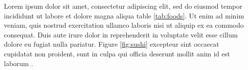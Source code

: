 Lorem ipsum dolor sit amet, consectetur adipiscing elit, sed do eiusmod tempor incididunt ut labore et dolore magna aliqua table \ref{tab:foods}. Ut enim ad minim veniam, quis nostrud exercitation ullamco \cite{perelman2003finite} laboris nisi ut aliquip ex ea commodo consequat. Duis aute irure dolor in reprehenderit in voluptate velit esse cillum dolore eu fugiat nulla pariatur. Figure \ref{fig:sushi} excepteur sint occaecat cupidatat non proident, sunt in culpa qui officia deserunt mollit anim id est laborum \cite{lorenz1963deterministic}.




